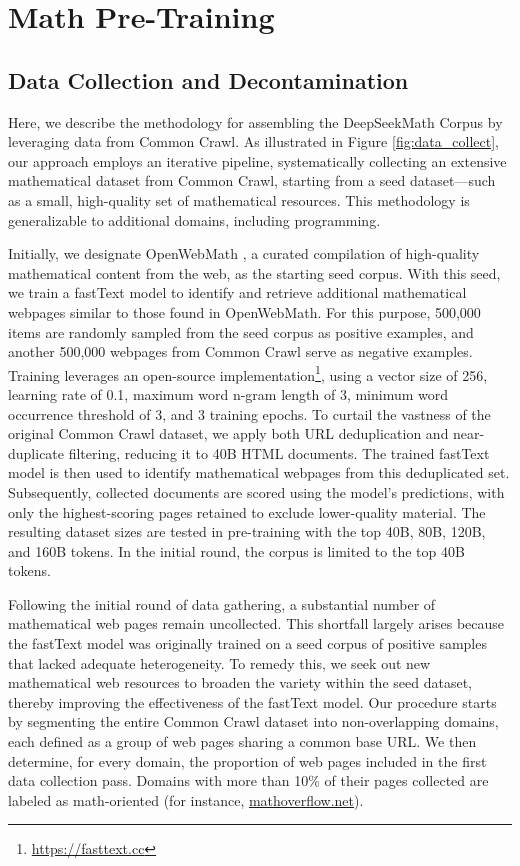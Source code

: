 \section{Math Pre-Training}

\subsection{Data Collection and Decontamination} Here, we describe the methodology for assembling the DeepSeekMath Corpus by leveraging data from Common Crawl. As illustrated in Figure \ref{fig:data_collect}, our approach employs an iterative pipeline, systematically collecting an extensive mathematical dataset from Common Crawl, starting from a seed dataset—such as a small, high-quality set of mathematical resources. This methodology is generalizable to additional domains, including programming.

Initially, we designate OpenWebMath \citep{openwebmath}, a curated compilation of high-quality mathematical content from the web, as the starting seed corpus. With this seed, we train a fastText model \citep{joulin2016fasttext} to identify and retrieve additional mathematical webpages similar to those found in OpenWebMath. For this purpose, 500,000 items are randomly sampled from the seed corpus as positive examples, and another 500,000 webpages from Common Crawl serve as negative examples. Training leverages an open-source implementation\footnote{\url{https://fasttext.cc}}, using a vector size of 256, learning rate of 0.1, maximum word n-gram length of 3, minimum word occurrence threshold of 3, and 3 training epochs. To curtail the vastness of the original Common Crawl dataset, we apply both URL deduplication and near-duplicate filtering, reducing it to 40B HTML documents. The trained fastText model is then used to identify mathematical webpages from this deduplicated set. Subsequently, collected documents are scored using the model’s predictions, with only the highest-scoring pages retained to exclude lower-quality material. The resulting dataset sizes are tested in pre-training with the top 40B, 80B, 120B, and 160B tokens. In the initial round, the corpus is limited to the top 40B tokens.

Following the initial round of data gathering, a substantial number of mathematical web pages remain uncollected. This shortfall largely arises because the fastText model was originally trained on a seed corpus of positive samples that lacked adequate heterogeneity. To remedy this, we seek out new mathematical web resources to broaden the variety within the seed dataset, thereby improving the effectiveness of the fastText model. Our procedure starts by segmenting the entire Common Crawl dataset into non-overlapping domains, each defined as a group of web pages sharing a common base URL. We then determine, for every domain, the proportion of web pages included in the first data collection pass. Domains with more than 10\% of their pages collected are labeled as math-oriented (for instance, \url{mathoverflow.net}).

